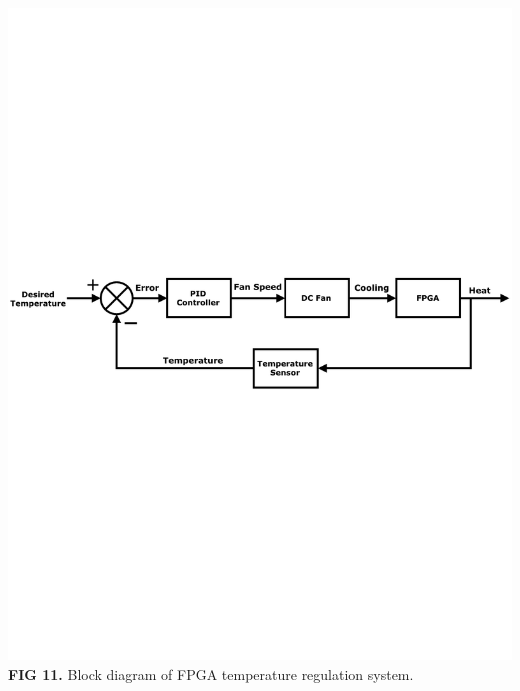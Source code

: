 \documentclass{article}
\begin{document}
\begin{center}
\includegraphics[scale=.75]{images/pidController}\\
\textbf{FIG 11.} Block diagram of FPGA temperature regulation system.\\
\end{center}
\end{document}
